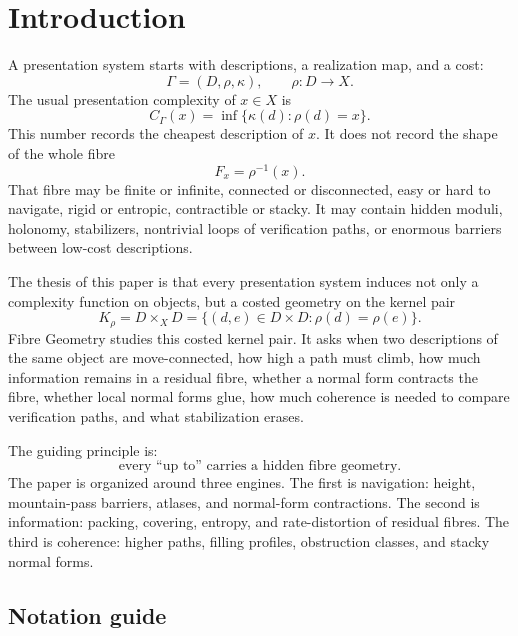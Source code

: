 \documentclass[11pt]{article}
\begin{document}
\section{Introduction}

A presentation system starts with descriptions, a realization map, and a cost:
\[
\Gamma=(D,\rho,\kappa),\qquad \rho:D\to X.
\]
The usual presentation complexity of \(x\in X\) is
\[
C_\Gamma(x)=\inf\{\kappa(d):\rho(d)=x\}.
\]
This number records the cheapest description of \(x\).  It does not record the shape of the whole fibre
\[
F_x=\rho^{-1}(x).
\]
That fibre may be finite or infinite, connected or disconnected, easy or hard to navigate, rigid or entropic, contractible or stacky.  It may contain hidden moduli, holonomy, stabilizers, nontrivial loops of verification paths, or enormous barriers between low-cost descriptions.

The thesis of this paper is that every presentation system induces not only a complexity function on objects, but a costed geometry on the kernel pair
\[
K_\rho=D\times_XD=\{(d,e)\in D\times D:\rho(d)=\rho(e)\}.
\]
Fibre Geometry studies this costed kernel pair.  It asks when two descriptions of the same object are move-connected, how high a path must climb, how much information remains in a residual fibre, whether a normal form contracts the fibre, whether local normal forms glue, how much coherence is needed to compare verification paths, and what stabilization erases.

The guiding principle is:
\[
\text{every ``up to'' carries a hidden fibre geometry.}
\]
The paper is organized around three engines.  The first is navigation: height, mountain-pass barriers, atlases, and normal-form contractions.  The second is information: packing, covering, entropy, and rate-distortion of residual fibres.  The third is coherence: higher paths, filling profiles, obstruction classes, and stacky normal forms.

\subsection*{Notation guide}
\end{document}
